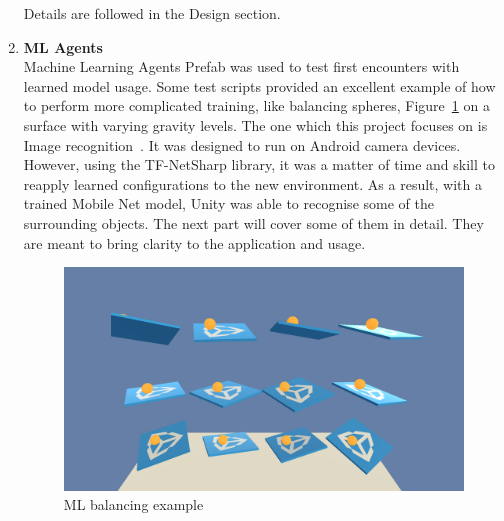\begin{enumerate}
    Details are followed in the Design section.
    \item \textbf{ML Agents} \\
    Machine Learning Agents Prefab was used to test first encounters with learned model usage.
    Some test scripts provided an excellent example of how to perform more complicated training, like balancing spheres, Figure~\ref{fig:ML-balancing} on a surface with varying gravity levels.
    The one which this project focuses on is Image recognition~\cite{unity-technologies_unity_2019}.
    It was designed to run on Android camera devices.
    However, using the TF-NetSharp library, it was a matter of time and skill to reapply learned configurations to the new environment. 
    As a result, with a trained Mobile Net model, Unity was able to recognise some of the surrounding objects.
    The next part will cover some of them in detail. 
    They are meant to bring clarity to the application and usage.
    \begin{figure}[H]
		\centering
		\includegraphics[width=0.5\linewidth]{project/images/balance.png}
		\caption{ML balancing example}
		\label{fig:ML-balancing}
	\end{figure}
\end{enumerate}